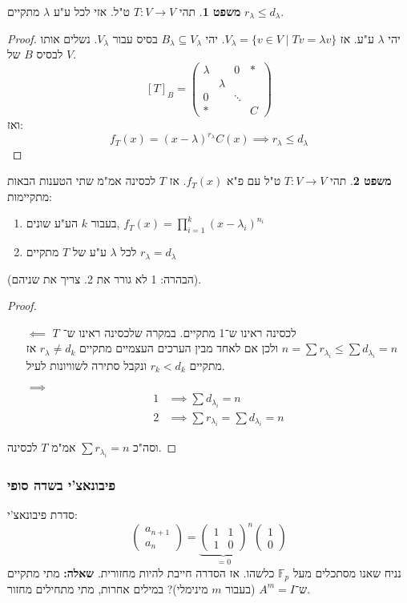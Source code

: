 \documentclass[a4paper]{article}
\newcommand\F         {\mathbb{F}}
\newcommand\co        {\colon}
\newcommand\pms[1]    {\begin{pmatrix}
		#1
\end{pmatrix}}
\renewcommand\lg      {\lambda}
\theoremstyle{definition}
\newtheorem{Theorem}{משפט}
\newcommand\theo  [1] {\begin{Theorem}#1\end{Theorem}}
\begin{document}
	
	\theo{תהי $T \co V \to V$ ט"ל. אזי לכל ע"ע $\lg$ מתקיים $r_\lg \le d_\lg$. }
	\begin{proof}
		יהי $\lg$ ע"ע. אז $V_\lg = \{v \in V \mid Tv = \lg v\}$. יהי $B_\lg \subseteq V_\lg$ בסיס עבור $V_\lg$. נשלים אותו לבסיס $B$ של $V$. 
		\[ [T]_B = \pms{\lg & & 0 & * \\ & \lg &  & \\ 0 && \ddots & \\ *&&& C} \]
		ואז: 
		\[ f_T(x) = (x - \lg)^{r_\lg}C(x) \implies r_\lg \le d_\lg \]
	\end{proof}
	
	\theo{תהי $T \co V \to V$ ט"ל עם פ"א $f_T(x)$. אז $T$ לכסינה אמ"מ שתי הטענות הבאות מתקיימות:
		\begin{enumerate}
			\item בעבור $k$ הע"ע שונים, $f_T(x) = \prod_{i = 1}^{k}(x - \lg_i)^{n_i}$
			\item לכל $\lg$ ע"ע של $T$ מתקיים $r_\lg = d_\lg$
		\end{enumerate}
	}
	(הבהרה: 1 לא גורר את 2. צריך את שניהם). 
	
	\begin{proof}\,
		\begin{itemize}
			\item[$\impliedby$]$T$ לכסינה ראינו ש־1 מתקיים. במקרה שלכסינה ראינו ש־$n = \sum r_{\lg_i} \le \sum d_{\lg_i} = n$ ולכן אם לאחד מבין הערכים העצמיים מתקיים $r_\lg \neq d_k$ אז מתקיים $r_k < d_k$ ונקבל סתירה לשוויונות  לעיל. 
			\item[$\implies$] 
			\begin{align*}
				1 &\implies \sum d_{\lg_i} = n \\
				2 &\implies \sum r_{\lg_i} = \sum d_{\lg_i} = n
			\end{align*}
		\end{itemize}
		וסה"כ $\sum r_{\lg_i} = n$ אמ"מ $T$ לכסינה. 
	\end{proof}
	
	\subsubsection{פיבונאצ'י בשדה סופי}
	סדרת פיבונאצ'י: 
	\[ \pms{a_{n + 1} \\ a_n} = {\underbrace{\pms{1 & 1 \\ 1 & 0}}_{ = 0}}^{n}\pms{1 \\ 0} \]
	נניח שאנו מסתכלים מעל $\F_p$ כלשהו. אז הסדרה חייבת להיות מחזורית. \textbf{שאלה: }מתי מתקיים ש־$A^m = I$ (בעבור $m$ מינימלי)? במילים אחרות, מתי מתחילים מחזור. 
	
\end{document}
